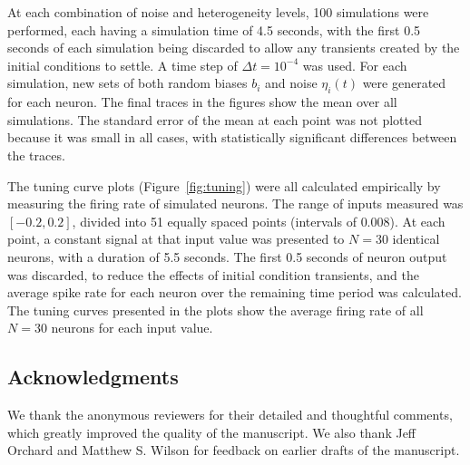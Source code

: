 \documentclass[12pt]{article}
\begin{document}
At each combination of noise and heterogeneity levels, 100 simulations were performed, each having a simulation time of 4.5 seconds, with the first 0.5 seconds of each simulation being discarded to allow any transients created by the initial conditions to settle. A time step of $\Delta t = 10^{-4}$ was used. For each simulation, new sets of both random biases $b_i$ and noise $\eta_i(t)$ were generated for each neuron. The final traces in the figures show the mean over all simulations. The standard error of the mean at each point was not plotted because it was small in all cases, with statistically significant differences between the traces.

The tuning curve plots (Figure~\ref{fig:tuning}) were all calculated empirically by measuring the firing rate of simulated neurons. The range of inputs measured was $[-0.2, 0.2]$, divided into 51 equally spaced points (intervals of $0.008$). At each point, a constant signal at that input value was presented to $N = 30$ identical neurons, with a duration of 5.5 seconds. The first 0.5 seconds of neuron output was discarded, to reduce the effects of initial condition transients, and the average spike rate for each neuron over the remaining time period was calculated.
The tuning curves presented in the plots show the average firing rate of all $N = 30$ neurons for each input value.

\subsection*{Acknowledgments}

We thank the anonymous reviewers for their detailed and thoughtful comments, which greatly improved the quality of the manuscript.
We also thank Jeff Orchard and Matthew S. Wilson for feedback on earlier drafts of the manuscript.
\end{document}

